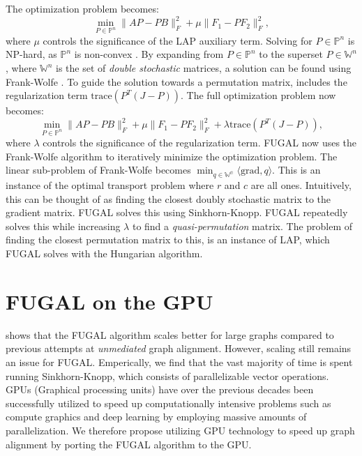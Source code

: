 \documentclass{article}
\begin{document}
The optimization problem becomes:
$$  \min_{P \in \mathds{P}^n} \lVert AP-PB \rVert^2_F + \mu \lVert F_1 - P F_2 \rVert^2_F, $$
where $\mu$ controls the significance of the LAP auxiliary term. Solving for $P \in \mathds{P}^n$ is NP-hard, as $\mathds{P}^n$ is non-convex \citep{koopmans1957assignment}. By expanding from $P \in \mathds{P}^n$ to the superset $P \in \mathds{W}^n$, where $\mathds{W}^n$ is the set of \textit{double stochastic} matrices, a solution can be found using Frank-Wolfe \citep{frank1956algorithm}. To guide the solution towards a permutation matrix, \citep{fugal2024} includes the regularization term $\text{trace}(P^T(J-P))$. The full optimization problem now becomes:
$$  \min_{P \in \mathds{P}^n} \lVert AP-PB \rVert^2_F + \mu \lVert F_1 - P F_2 \rVert^2_F + \lambda \text{trace}(P^T(J-P)), $$
where $\lambda$ controls the significance of the regularization term. FUGAL now uses the Frank-Wolfe algorithm to iteratively minimize the optimization problem. The linear sub-problem of Frank-Wolfe becomes $\min_{q\in \mathds{W^n}} \langle \text{grad}, q \rangle$. This is an instance of the optimal transport problem where $r$ and $c$ are all ones. Intuitively, this can be thought of as finding the closest doubly stochastic matrix to the gradient matrix. FUGAL solves this using Sinkhorn-Knopp. FUGAL repeatedly solves this while increasing $\lambda$ to find a \textit{quasi-permutation} matrix. The problem of finding the closest permutation matrix to this, is an instance of LAP, which FUGAL solves with the Hungarian algorithm.

\section{FUGAL on the GPU}
\citep{fugal2024} shows that the FUGAL algorithm scales better for large graphs compared to previous attempts at \textit{unmediated} graph alignment. However, scaling still remains an issue for FUGAL. Emperically, we find that the vast majority of time is spent running Sinkhorn-Knopp, which consists of parallelizable vector operations. GPUs (Graphical processing units) have over the previous decades been successfully utilized to speed up computationally intensive problems such as compute graphics and deep learning by employing massive amounts of parallelization. We therefore propose utilizing GPU technology to speed up graph alignment by porting the FUGAL algorithm to the GPU.
\end{document}

